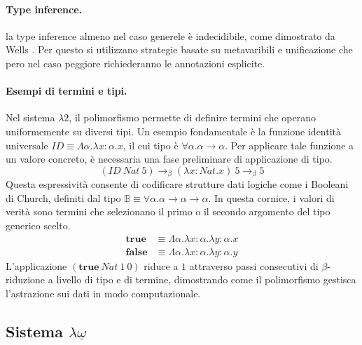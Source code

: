 \paragraph{Type inference.} 
la type inference almeno nel caso generele è indecidibile, come dimostrato da Wells \cite{wells1994}. Per questo si utilizzano 
strategie basate su metavaribili e unificazione che pero nel caso peggiore richiederanno le annotazioni esplicite.

\paragraph{Esempi di termini e tipi.}
Nel sistema $\lambda 2$, il polimorfismo permette di definire termini che operano uniformemente su diversi tipi. 
Un esempio fondamentale è la funzione identità universale $ID \equiv \Lambda \alpha. \lambda x : \alpha. x$, 
il cui tipo è $\forall \alpha. \alpha \to \alpha$. Per applicare tale funzione a un valore concreto, è necessaria 
una fase preliminare di applicazione di tipo.
\begin{equation}
    (ID \: Nat \: 5 ) \to_\beta (\lambda x : Nat. x) \: 5 \to_\beta 5
\end{equation}
Questa espressività consente di codificare strutture dati logiche come i Booleani di Church, definiti dal tipo 
$\mathbb{B} \equiv \forall \alpha. \alpha \to \alpha \to \alpha$. In questa cornice, i valori di verità sono 
termini che selezionano il primo o il secondo argomento del tipo generico scelto.
\begin{align*}
    \mathbf{true}  &\equiv \Lambda \alpha. \lambda x:\alpha. \lambda y:\alpha. x \\
    \mathbf{false} &\equiv \Lambda \alpha. \lambda x:\alpha. \lambda y:\alpha. y
\end{align*}
L'applicazione $(\mathbf{true} \: Nat \: 1 \: 0)$ riduce a $1$ attraverso passi consecutivi di $\beta$-riduzione a 
livello di tipo e di termine, dimostrando come il polimorfismo gestisca l'astrazione sui dati in modo computazionale.
\subsection{Sistema \texorpdfstring{$\lambda\underline{\omega}$}{Lambda-omega-under}}

